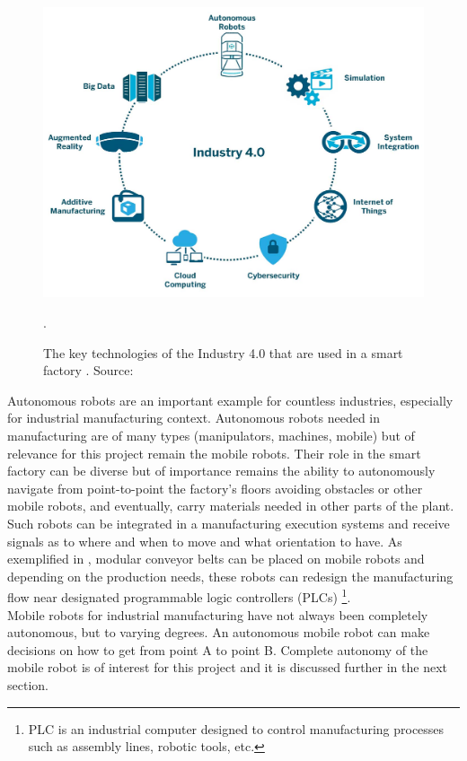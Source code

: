 \begin{figure}[H]
\includegraphics[scale=0.3]{Figures/Industry40.jpg}
\centering
\caption{The key technologies of the Industry 4.0 that are used in a smart factory \cite{boston}. Source: \cite{aethon}}.
\label{industry40}
\end{figure}

Autonomous robots are an important example for countless industries, especially for industrial manufacturing context. Autonomous robots needed in manufacturing are of many types (manipulators, machines, mobile) but of relevance for this project remain the mobile robots. Their role in the smart factory can be diverse but of importance remains the ability to autonomously navigate from point-to-point the factory's floors avoiding obstacles or other mobile robots, and eventually, carry materials needed in other parts of the plant. Such robots can be integrated in a manufacturing execution systems and receive signals as to where and when to move and what orientation to have. As exemplified in \cite{aethon}, modular conveyor belts can be placed on mobile robots and depending on the production needs, these robots can redesign the manufacturing flow near designated programmable logic controllers (PLCs) \footnote{PLC is an industrial computer designed to control manufacturing processes such as assembly lines, robotic tools, etc.}.\\

Mobile robots for industrial manufacturing have not always been completely autonomous, but to varying degrees. An autonomous mobile robot can make decisions on how to get from point A to point B. Complete autonomy of the mobile robot is of interest for this project and it is discussed further in the next section.



